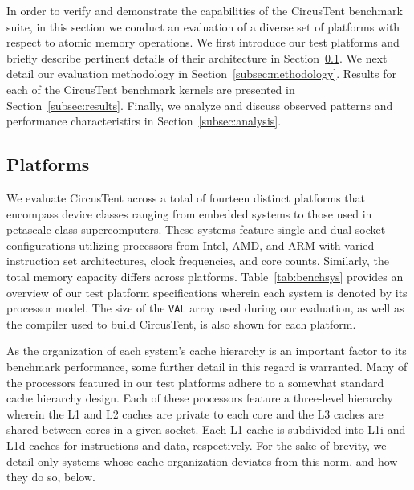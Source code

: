 
In order to verify and demonstrate the capabilities of the CircusTent benchmark suite, in this section we conduct an evaluation of a diverse set of platforms with respect to atomic memory operations.
We first introduce our test platforms and briefly describe pertinent details of their architecture in Section~\ref{subsec:platforms}.
We next detail our evaluation methodology in Section~\ref{subsec:methodology}.
Results for each of the CircusTent benchmark kernels are presented in Section~\ref{subsec:results}.
Finally, we analyze and discuss observed patterns and performance characteristics in Section~\ref{subsec:analysis}.

\subsection{Platforms}
\label{subsec:platforms}

We evaluate CircusTent across a total of fourteen distinct platforms that encompass device classes ranging from embedded systems to those used in petascale-class supercomputers.
These systems feature single and dual socket configurations utilizing processors from Intel, AMD, and ARM with varied instruction set architectures, clock frequencies, and core counts.
Similarly, the total memory capacity differs across platforms.
Table~\ref{tab:benchsys} provides an overview of our test platform specifications wherein each system is denoted by its processor model.
The size of the \texttt{VAL} array used during our evaluation, as well as the compiler used to build CircusTent, is also shown for each platform.

As the organization of each system's cache hierarchy is an important factor to its benchmark performance, some further detail in this regard is warranted.
Many of the processors featured in our test platforms adhere to a somewhat standard cache hierarchy design.
Each of these processors feature a three-level hierarchy wherein the L1 and L2 caches are private to each core and the L3 caches are shared between cores in a given socket.
Each L1 cache is subdivided into L1i and L1d caches for instructions and data, respectively.
For the sake of brevity, we detail only systems whose cache organization deviates from this norm, and how they do so, below.

